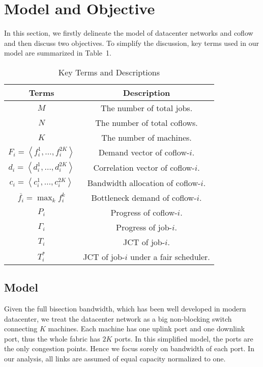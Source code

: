 \documentclass[10pt, conference, letterpaper]{IEEEtran}
\begin{document}
\section{Model and Objective}
In this section, we firstly delineate the model of datacenter networks and coflow and then discuss two objectives. To simplify the discussion, key terms used in our model are summarized in Table~1.
\begin{table}
\caption{Key Terms and Descriptions}
\begin{center}
\begin{tabular}{|c|c|}
\hline
Terms & Description\\
\hline
$M$ & The number of total jobs.\\
\hline
$N$ & The number of total coflows.\\
\hline
$K$ & The number of machines.\\
\hline
$F_i = \left\langle f_i^1,\dots,f_i^{2K}\right\rangle$ & Demand vector of coflow-$i$.\\
\hline
$d_i = \left\langle d_i^1,\dots,d_i^{2K}\right\rangle$ & Correlation vector of coflow-$i$.\\
\hline
$c_i=\left\langle c_i^1,\dots,c_i^{2K}\right\rangle$ & Bandwidth allocation of coflow-$i$.\\
\hline
$\overline{f_i}=\max_{k} f_i^k$ & Bottleneck demand of coflow-$i$.\\
\hline
$P_i$ & Progress of coflow-$i$.\\
\hline
$\Gamma_i$ & Progress of job-$i$.\\
\hline
$T_i$ & JCT of job-$i$.\\
\hline
$T_i^*$ & JCT of job-$i$ under a fair scheduler.\\
\hline
\end{tabular}
\end{center}
\end{table}

\subsection{Model}
Given the full bisection bandwidth, which has been well developed in modern datacenter\cite{jupiter}, we treat the datacenter network as a big non-blocking switch connecting $K$ machines. Each machine has one uplink port and one downlink port, thus the whole fabric has $2K$ ports. In this simplified model, the ports are the only congestion points. Hence we focus sorely on bandwidth of each port. In our analysis, all links are assumed of equal capacity normalized to one.
\end{document}

